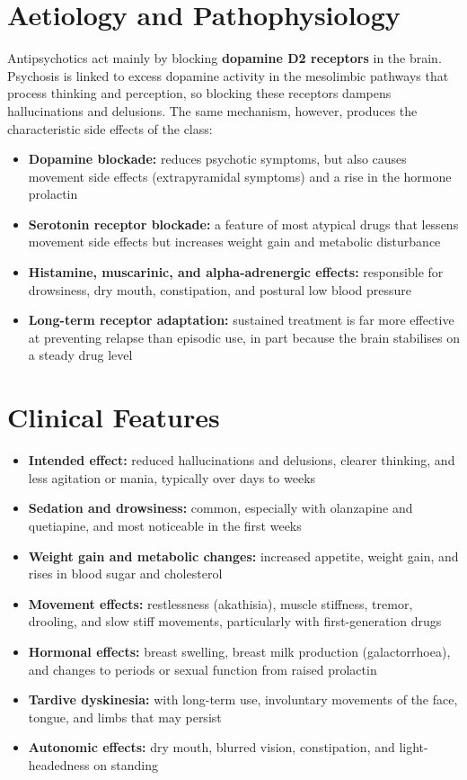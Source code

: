 \section*{Aetiology and Pathophysiology}
Antipsychotics act mainly by blocking \textbf{dopamine D2 receptors} in the brain. Psychosis is linked to excess dopamine activity in the mesolimbic pathways that process thinking and perception, so blocking these receptors dampens hallucinations and delusions. The same mechanism, however, produces the characteristic side effects of the class:

\begin{itemize}
    \item \textbf{Dopamine blockade:} reduces psychotic symptoms, but also causes movement side effects (extrapyramidal symptoms) and a rise in the hormone prolactin
    \item \textbf{Serotonin receptor blockade:} a feature of most atypical drugs that lessens movement side effects but increases weight gain and metabolic disturbance
    \item \textbf{Histamine, muscarinic, and alpha-adrenergic effects:} responsible for drowsiness, dry mouth, constipation, and postural low blood pressure
    \item \textbf{Long-term receptor adaptation:} sustained treatment is far more effective at preventing relapse than episodic use, in part because the brain stabilises on a steady drug level
\end{itemize}

\section*{Clinical Features}
\begin{itemize}
    \item \textbf{Intended effect:} reduced hallucinations and delusions, clearer thinking, and less agitation or mania, typically over days to weeks
    \item \textbf{Sedation and drowsiness:} common, especially with olanzapine and quetiapine, and most noticeable in the first weeks
    \item \textbf{Weight gain and metabolic changes:} increased appetite, weight gain, and rises in blood sugar and cholesterol
    \item \textbf{Movement effects:} restlessness (akathisia), muscle stiffness, tremor, drooling, and slow stiff movements, particularly with first-generation drugs
    \item \textbf{Hormonal effects:} breast swelling, breast milk production (galactorrhoea), and changes to periods or sexual function from raised prolactin
    \item \textbf{Tardive dyskinesia:} with long-term use, involuntary movements of the face, tongue, and limbs that may persist
    \item \textbf{Autonomic effects:} dry mouth, blurred vision, constipation, and light-headedness on standing
\end{itemize}


